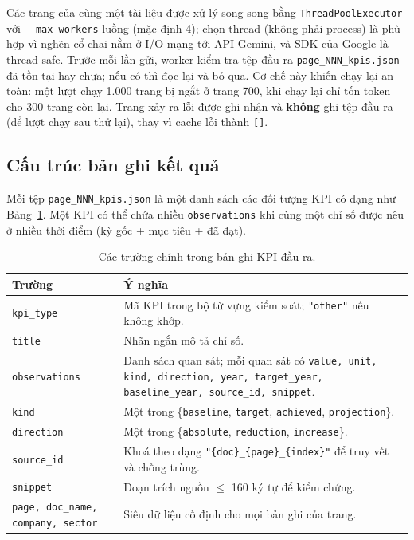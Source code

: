 \documentclass{article}
\begin{document}
Các trang của cùng một tài liệu được xử lý song song bằng
\texttt{ThreadPoolExecutor} với \texttt{-{}-max-workers} luồng (mặc định 4); chọn
thread (không phải process) là phù hợp vì nghẽn cổ chai nằm ở I/O mạng tới
API Gemini, và SDK của Google là thread-safe. Trước mỗi lần gửi, worker kiểm tra
tệp đầu ra \texttt{page\_NNN\_kpis.json} đã tồn tại hay chưa; nếu có thì đọc
lại và bỏ qua. Cơ chế này khiến chạy lại an toàn: một lượt chạy 1.000 trang bị
ngắt ở trang 700, khi chạy lại chỉ tốn token cho 300 trang còn lại. Trang xảy
ra lỗi được ghi nhận và \textbf{không} ghi tệp đầu ra (để lượt chạy sau thử
lại), thay vì cache lỗi thành \texttt{[]}.

\subsection{Cấu trúc bản ghi kết quả}

Mỗi tệp \texttt{page\_NNN\_kpis.json} là một danh sách các đối tượng KPI có dạng
như Bảng~\ref{tab:kpi-record}. Một KPI có thể chứa nhiều \texttt{observations}
khi cùng một chỉ số được nêu ở nhiều thời điểm (kỳ gốc + mục tiêu + đã đạt).

\begin{table}[H]
  \centering
  \caption{Các trường chính trong bản ghi KPI đầu ra.}
  \label{tab:kpi-record}
  \begin{tabularx}{\linewidth}{l X}
    \hline
    \textbf{Trường} & \textbf{Ý nghĩa} \\
    \hline
    \texttt{kpi\_type}   & Mã KPI trong bộ từ vựng kiểm soát; \texttt{"other"} nếu không khớp. \\
    \texttt{title}       & Nhãn ngắn mô tả chỉ số. \\
    \texttt{observations}& Danh sách quan sát; mỗi quan sát có \texttt{value, unit, kind, direction, year, target\_year, baseline\_year, source\_id, snippet}. \\
    \texttt{kind}        & Một trong \{\texttt{baseline}, \texttt{target}, \texttt{achieved}, \texttt{projection}\}. \\
    \texttt{direction}   & Một trong \{\texttt{absolute}, \texttt{reduction}, \texttt{increase}\}. \\
    \texttt{source\_id}  & Khoá theo dạng \texttt{"\{doc\}\_\{page\}\_\{index\}"} để truy vết và chống trùng. \\
    \texttt{snippet}     & Đoạn trích nguồn $\le$ 160 ký tự để kiểm chứng. \\
    \texttt{page, doc\_name, company, sector} & Siêu dữ liệu cố định cho mọi bản ghi của trang. \\
    \hline
  \end{tabularx}
\end{table}
\end{document}

